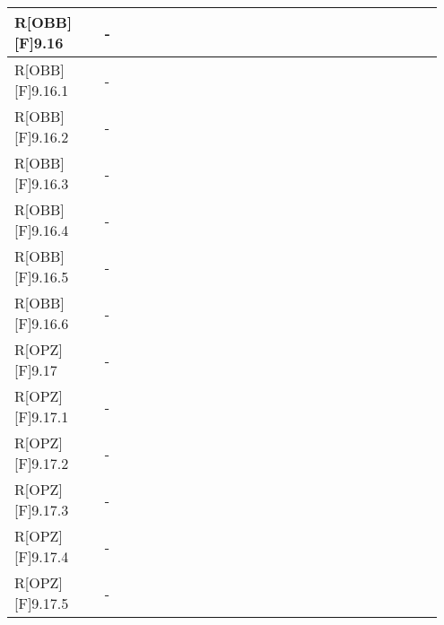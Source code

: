 \begin{table}[h]
\begin{center}
\begin{tabular}{|p{0.2\linewidth}|p{0.75\linewidth}|}
		\midrule
			R[OBB][F]9.16 & -\\
		\midrule
			R[OBB][F]9.16.1 & -\\
		\midrule
			R[OBB][F]9.16.2 & -\\
		\midrule
			R[OBB][F]9.16.3 & -\\
		\midrule
			R[OBB][F]9.16.4 & -\\
		\midrule
			R[OBB][F]9.16.5 & -\\
		\midrule
			R[OBB][F]9.16.6 & -\\
		\midrule
			R[OPZ][F]9.17 & -\\
		\midrule
			R[OPZ][F]9.17.1 & -\\
		\midrule
			R[OPZ][F]9.17.2 & -\\
		\midrule
			R[OPZ][F]9.17.3 & -\\
		\midrule
			R[OPZ][F]9.17.4 & -\\
		\midrule
			R[OPZ][F]9.17.5 & -\\
		\bottomrule
		\end{tabular}
	\end{center}
\end{table}


